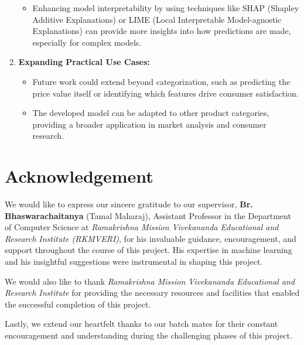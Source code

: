 \documentclass[12pt]{report}
\begin{document}
\begin{enumerate}
	      \begin{itemize}
		      \setlength\itemsep{-1.5em}
		      \item Enhancing model interpretability by using techniques like SHAP (Shapley Additive Explanations) or LIME (Local Interpretable Model-agnostic Explanations) can provide more insights into how predictions are made, especially for complex models.
	      \end{itemize}
	\item{\textbf{Expanding Practical Use Cases:	}}
	      \vspace{-1.65em}
	      \begin{itemize}
		      \setlength\itemsep{-1.5em}
		      \item Future work could extend beyond categorization, such as predicting the price value itself or identifying which features drive consumer satisfaction.
		      \item The developed model can be adapted to other product categories, providing a broader application in market analysis and consumer research.
	      \end{itemize}
\end{enumerate}

\chapter*{Acknowledgement}

We would like to express our sincere gratitude to our supervisor, \textbf{Br. Bhaswarachaitanya} (Tamal Maharaj), Assistant Professor in the Department of Computer Science at \textit{Ramakrishna Mission Vivekananda Educational and Research Institute (RKMVERI)}, for his invaluable guidance, encouragement, and support throughout the course of this project. His expertise in machine learning and his insightful suggestions were instrumental in shaping this project.

We would also like to thank \textit{Ramakrishna Mission Vivekananda Educational and Research Institute} for providing the necessary resources and facilities that enabled the successful completion of this project.

Lastly, we extend our heartfelt thanks to our batch mates for their constant encouragement and understanding during the challenging phases of this project.
\end{document}

